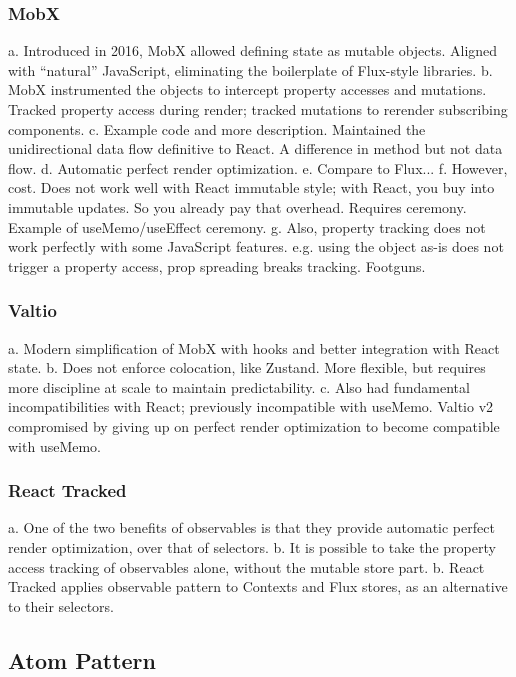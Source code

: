 \documentclass{article}
\begin{document}
\subsubsection{MobX}

a. Introduced in 2016, MobX allowed defining state as mutable objects. Aligned with ``natural'' JavaScript, eliminating the boilerplate of Flux-style libraries.
b. MobX instrumented the objects to intercept property accesses and mutations. Tracked property access during render; tracked mutations to rerender subscribing components.
c. Example code and more description. Maintained the unidirectional data flow definitive to React. A difference in method but not data flow.
d. Automatic perfect render optimization.
e. Compare to Flux...
f. However, cost. Does not work well with React immutable style; with React, you  buy into immutable updates. So you already pay that overhead. Requires ceremony. Example of useMemo/useEffect ceremony.
g. Also, property tracking does not work perfectly with some JavaScript features. e.g. using the object as-is does not trigger a property access, prop spreading breaks tracking. Footguns.

\subsubsection{Valtio}

a. Modern simplification of MobX with hooks and better integration with React state.
b. Does not enforce colocation, like Zustand. More flexible, but requires more discipline at scale to maintain predictability.
c. Also had fundamental incompatibilities with React; previously incompatible with useMemo. Valtio v2 compromised by giving up on perfect render optimization to become compatible with useMemo.

\subsubsection{React Tracked}

a. One of the two benefits of observables is that they provide automatic perfect render optimization, over that of selectors.
b. It is possible to take the property access tracking of observables alone, without the mutable store part.
b. React Tracked applies observable pattern to Contexts and Flux stores, as an alternative to their selectors.

\subsection{Atom Pattern}
\end{document}
